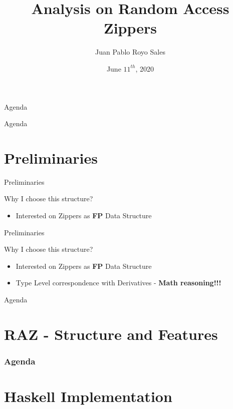 \documentclass{beamer}
\title{Analysis on Random Access Zippers}
\author{Juan Pablo Royo Sales}
\institute{Universitat Politècnica de Catalunya}
\date{June $11^{th}$, 2020}
\begin{document}
\begin{frame}
\titlepage
\end{frame}

\begin{frame}{Agenda}
  \tableofcontents
\end{frame}

\begin{frame}{Agenda}
  \section{Preliminaries}
  \tableofcontents[currentsection]
\end{frame}

\begin{frame}[fragile]{Preliminaries}

  \begin{block}{Why I choose this structure?}
    \begin{itemize}
      \item Interested on Zippers as \textbf{FP} Data Structure
    \end{itemize}
  \end{block}

\end{frame}

\begin{frame}[fragile]{Preliminaries}

  \begin{block}{Why I choose this structure?}
    \begin{itemize}
      \item Interested on Zippers as \textbf{FP} Data Structure
      \item Type Level correspondence with Derivatives - \textbf{Math reasoning!!!}
      \end{itemize}
  \end{block}

\end{frame}



\begin{frame}{Agenda}
  \section{RAZ - Structure and Features}
  \tableofcontents[currentsection]
\end{frame}

\begin{frame}
  \frametitle{Agenda}
  \section{Haskell Implementation}
  \tableofcontents[currentsection]
\end{frame}
\end{document}
